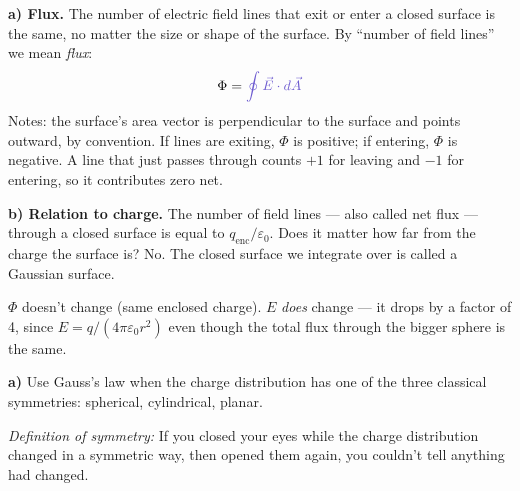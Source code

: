 \documentclass[11pt]{article}
\newcommand{\ANS}[1]{\textcolor{accent}{#1}}
\begin{document}



\textbf{a) Flux.} The number of electric field lines that exit or enter a
\ANS{closed surface} is the same, no matter the \ANS{size or shape} of the surface. By
``number of field lines'' we mean \emph{flux}:
\[
\Phi = {}\ANS{\oint \vec{E}\cdot d\vec{A}}
\]
Notes: the surface's area vector is \ANS{perpendicular} to the surface and points
\ANS{outward}, by convention. If lines are exiting, $\Phi$ is \ANS{positive}; if entering,
$\Phi$ is \ANS{negative}. A line that just passes through counts $+1$ for leaving and
$-1$ for entering, so it contributes \ANS{zero} net.

\textbf{b) Relation to charge.} The number of field lines --- also called \ANS{net flux}
--- through a closed surface is equal to \ANS{$q_{\text{enc}}/\varepsilon_0$}. Does it
matter how far from the charge the surface is? \ANS{No.} The closed surface we integrate
over is called a \ANS{Gaussian surface}.

{\small\color{accent} $\Phi$ doesn't change (same enclosed charge). $E$ \emph{does} change
--- it drops by a factor of 4, since $E=q/(4\pi\varepsilon_0 r^2)$ even though the total
flux through the bigger sphere is the same.}


\textbf{a)} Use Gauss's law when the charge distribution has one of the three classical
symmetries: \ANS{spherical}, \ANS{cylindrical}, \ANS{planar}.

\textit{Definition of symmetry:} \ANS{If you closed your eyes while the charge
distribution changed in a symmetric way, then opened them again, you couldn't tell
anything had changed.}
\end{document}
